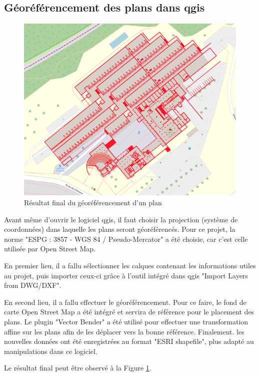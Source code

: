 \documentclass[
    iai, %
    il, %
]{heig-tb}
\begin{document}
\subsection{Géoréférencement des plans dans \gls{qgis}}
\begin{figure}[h]
    \centering
    \includegraphics[scale=0.5]{Géoréférencement.png}
    \caption{Résultat final du géoréférencement d'un plan}
    \label{fig:georeferencement}
\end{figure}

Avant même d'ouvrir le logiciel \gls{qgis}, il faut choisir la projection (système de coordonnées) dans laquelle les plans seront géoréférencés.
Pour ce projet, la norme "ESPG : 3857 - WGS 84 / Pseudo-Mercator" a été choisie, car c'est celle utilisée par Open Street Map.

En premier lieu, il a fallu sélectionner les calques contenant les informations utiles au projet,
puis importer ceux-ci grâce à l'outil intégré dans \gls{qgis} "Import Layers from DWG/DXF".

En second lieu, il a fallu effectuer le géoréférencement.
Pour ce faire, le fond de carte Open Street Map a été intégré et servira de référence pour le placement des plans.
Le plugin "Vector Bender" a été utilisé pour effectuer une transformation affine sur les plans afin de les déplacer vers la bonne référence.
Finalement. les nouvelles données ont été enregistrées au format "ESRI shapefile", plus adapté au manipulations dans ce logiciel.

Le résultat final peut être observé à la Figure \ref{fig:georeferencement}.
\end{document}
